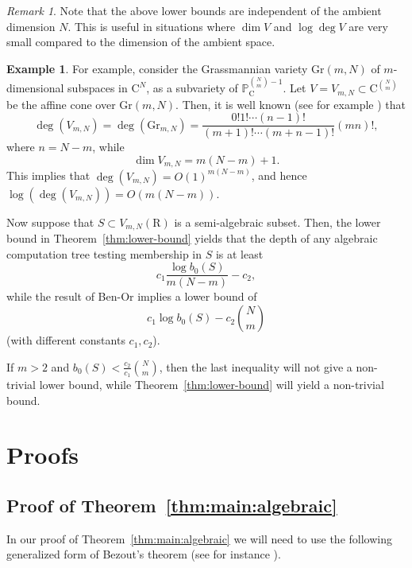 \documentclass[10pt]{amsart}
\theoremstyle{definition}
\newtheorem{example}{Example}[section]
\theoremstyle{remark}
\newtheorem{remark}{Remark}
\numberwithin{equation}{section}
\newcommand {\R} {\mathrm{R}}
\newcommand {\C}     {\mathrm{C}}
\newcommand {\PP}     {\mathbb{P}} %
\newcommand{\Gr}{\mathrm{Gr}}
\begin{document}
\begin{remark}
    Note that the above lower bounds are independent of the ambient dimension $N$.
    This is useful in situations where $\dim V$
    and $\log \deg V$ are very small compared to the dimension of the ambient space.

    \begin{example}
    For example, consider the Grassmannian variety $\Gr(m,N)$ of $m$-dimensional subspaces in $\C^N$, as a subvariety of $\PP_\C^{\binom{N}{m}-1}$.
    Let $V = V_{m,N}  \subset \C^{\binom{N}{m}}$ be the affine cone 
    over $\Gr(m,N)$. Then, it is well known 
    (see for example \cite[Corollary 3.2.14]{Manivel}) that
    \begin{equation}
        \label{eqn:deg:grassmannian}
        \deg (V_{m,N}) = \deg(\Gr_{m,N}) = \frac{0!1! \cdots (n-1)!}{(m+1)!\cdots (m+n-1)!}(mn)!,
    \end{equation}
    where $n = N - m$,
    while
    \[
    \dim V_{m,N} = m(N-m)+1.
    \]
    This implies that 
    $\deg (V_{m,N}) = O(1)^{m(N-m)}$, and hence
    $ \log(\deg (V_{m,N})) = O(m(N-m))$.

    Now suppose that $S \subset V_{m,N}(\R)$ is a semi-algebraic subset.
    Then, the lower bound in Theorem~\ref{thm:lower-bound} yields that the 
    depth of any algebraic computation tree testing membership in $S$ is 
    at least
\[
c_1 \frac{\log b_0(S)}{m(N-m)}  - c_2,
\]
while the result of Ben-Or implies a lower bound of 
\[
c_1\log b_0(S) -  c_2 \binom{N}{m}
\]
(with different constants $c_1,c_2$).

If $m >2$ and $b_0(S) < \frac{c_2}{c_1}\binom{N}{m}$, then the last inequality will not give a non-trivial lower bound,  while Theorem~\ref{thm:lower-bound} will yield a non-trivial bound.
\end{example}
\end{remark}






\section{Proofs}
\label{sec:proof}

\subsection{Proof of Theorem~\ref{thm:main:algebraic} 
}

In our proof of Theorem~\ref{thm:main:algebraic} we will need to use the following generalized form of Bezout's theorem
(see for instance \cite[Example 8.4.6, page 148]{Fulton}).
\end{document}
